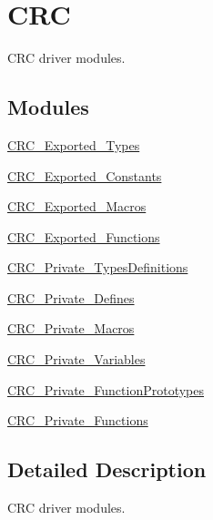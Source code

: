 \hypertarget{group___c_r_c}{}\section{C\+RC}
\label{group___c_r_c}


C\+RC driver modules.  


\subsection*{Modules}
\begin{DoxyCompactItemize}
\item 
\mbox{\hyperlink{group___c_r_c___exported___types}{C\+R\+C\+\_\+\+Exported\+\_\+\+Types}}
\item 
\mbox{\hyperlink{group___c_r_c___exported___constants}{C\+R\+C\+\_\+\+Exported\+\_\+\+Constants}}
\item 
\mbox{\hyperlink{group___c_r_c___exported___macros}{C\+R\+C\+\_\+\+Exported\+\_\+\+Macros}}
\item 
\mbox{\hyperlink{group___c_r_c___exported___functions}{C\+R\+C\+\_\+\+Exported\+\_\+\+Functions}}
\item 
\mbox{\hyperlink{group___c_r_c___private___types_definitions}{C\+R\+C\+\_\+\+Private\+\_\+\+Types\+Definitions}}
\item 
\mbox{\hyperlink{group___c_r_c___private___defines}{C\+R\+C\+\_\+\+Private\+\_\+\+Defines}}
\item 
\mbox{\hyperlink{group___c_r_c___private___macros}{C\+R\+C\+\_\+\+Private\+\_\+\+Macros}}
\item 
\mbox{\hyperlink{group___c_r_c___private___variables}{C\+R\+C\+\_\+\+Private\+\_\+\+Variables}}
\item 
\mbox{\hyperlink{group___c_r_c___private___function_prototypes}{C\+R\+C\+\_\+\+Private\+\_\+\+Function\+Prototypes}}
\item 
\mbox{\hyperlink{group___c_r_c___private___functions}{C\+R\+C\+\_\+\+Private\+\_\+\+Functions}}
\end{DoxyCompactItemize}


\subsection{Detailed Description}
C\+RC driver modules. 

